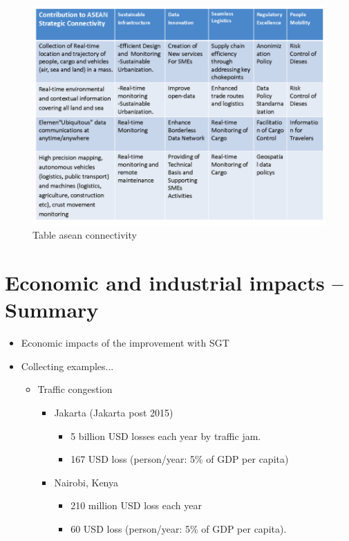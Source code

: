 \begin{figure}[H]
\begin{center}
\includegraphics[width = 0.8\linewidth]{Figures/asean_connectivity.png}
\end{center}
\caption{Table asean connectivity}
\label{asean_connectivity}
\end{figure}



\section{Economic and industrial impacts -- Summary}

\begin{itemize}

\item Economic impacts of the improvement with SGT

\item Collecting examples...

	\begin{itemize}

	\item Traffic congestion

		\begin{itemize}

		\item Jakarta (Jakarta post 2015)
		
			\begin{itemize}
			\item 5 billion USD losses each year by traffic jam.
			\item 167 USD loss (person/year: 5\% of GDP per capita)
			\end{itemize}

		\item Nairobi, Kenya
		
			\begin{itemize}	
			\item 210 million USD loss each year 
			\item 60 USD loss (person/year: 5\% of GDP per capita).
			\end{itemize}

		\end{itemize}
	\end{itemize}
\end{itemize}

